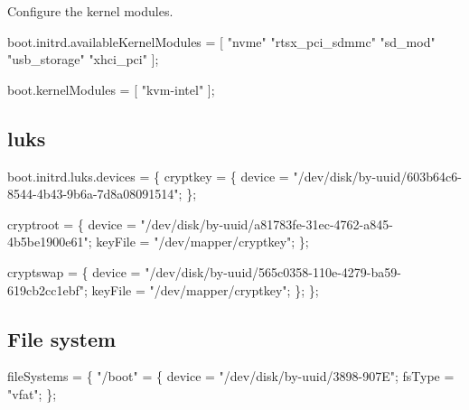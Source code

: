 Configure the kernel modules.

\nwenddocs{}\endmoddef\nwstartdeflinemarkup{}\nwenddeflinemarkup
boot.initrd.availableKernelModules = [
  "nvme"
  "rtsx_pci_sdmmc"
  "sd_mod"
  "usb_storage"
  "xhci_pci"
];

boot.kernelModules = [ "kvm-intel" ];
\nwendcode{}\nwdocspar

\subsection{luks}


\nwenddocs{}\endmoddef\nwstartdeflinemarkup{}\nwenddeflinemarkup
boot.initrd.luks.devices = \{
  cryptkey = \{
    device = "/dev/disk/by-uuid/603b64c6-8544-4b43-9b6a-7d8a08091514";
  \};

  cryptroot = \{
    device = "/dev/disk/by-uuid/a81783fe-31ec-4762-a845-4b5be1900e61";
    keyFile = "/dev/mapper/cryptkey";
  \};

  cryptswap = \{
    device = "/dev/disk/by-uuid/565c0358-110e-4279-ba59-619cb2cc1ebf";
    keyFile = "/dev/mapper/cryptkey";
  \};
\};
\nwendcode{}\nwdocspar

\subsection{File system}


\nwenddocs{}\endmoddef\nwstartdeflinemarkup{}\nwenddeflinemarkup
fileSystems = \{
  "/boot" = \{
    device = "/dev/disk/by-uuid/3898-907E";
    fsType = "vfat";
  \};

